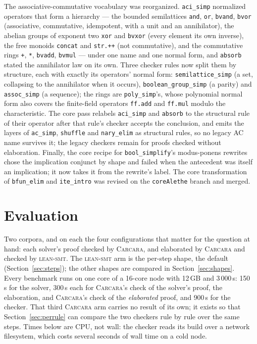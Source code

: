\documentclass[runningheads]{llncs}
\newcommand{\tactic}{\textsc{lean-smt}\xspace}
\newcommand{\carcara}{\textsc{Carcara}\xspace}
\newcommand{\rulename}[1]{\texttt{#1}}
\begin{document}
The associative-commutative vocabulary was reorganized. \rulename{aci\_simp}
normalized operators that form a hierarchy --- the bounded semilattices
\texttt{and}, \texttt{or}, \texttt{bvand}, \texttt{bvor} (associative,
commutative, idempotent, with a unit and an annihilator), the abelian groups
of exponent two \texttt{xor} and \texttt{bvxor} (every element its own
inverse), the free monoids \texttt{concat} and \texttt{str.++} (not
commutative), and the commutative rings \texttt{+}, \texttt{*},
\texttt{bvadd}, \texttt{bvmul} --- under one name and one normal form, and
\rulename{absorb} stated the annihilator law on its own. Three checker rules
now split them by structure, each with exactly its operators' normal form:
\rulename{semilattice\_simp} (a set, collapsing to the annihilator when it
occurs), \rulename{boolean\_group\_simp} (a parity) and \rulename{assoc\_simp}
(a sequence); the rings are \rulename{poly\_simp}'s, whose polynomial normal
form also covers the finite-field operators \texttt{ff.add} and
\texttt{ff.mul} modulo the characteristic. The core pass relabels
\rulename{aci\_simp} and \rulename{absorb} to the structural rule of their
operator after that rule's checker accepts the conclusion, and emits the
layers of \rulename{ac\_simp}, \rulename{shuffle} and \rulename{nary\_elim}
as structural rules, so no legacy AC name survives it; the legacy checkers
remain for proofs checked without elaboration. Finally, the core recipe for
\rulename{bool\_simplify}'s modus-ponens rewrites chose the implication
conjunct by shape and failed when the antecedent was itself an implication;
it now takes it from the rewrite's label. The core transformation of
\rulename{bfun\_elim} and \rulename{ite\_intro} was revised on the
\texttt{coreAlethe} branch and merged.

\section{Evaluation}
\label{sec:eval}

Two corpora, and on each the four configurations that matter for the
question at hand: each solver's proof checked by \carcara, and elaborated by
\carcara and checked by \tactic. The \tactic arm is the per-step shape, the
default (Section~\ref{sec:steps}); the other shapes are compared in
Section~\ref{sec:shapes}. Every benchmark runs on one core of a 16-core node
with 12\,GB and 3\,000\,s: 150\,s for the solver, 300\,s each for \carcara's
check of the solver's proof, the elaboration, and \carcara's check of the
\emph{elaborated} proof, and 900\,s for the checker. That third \carcara arm
carries no result of its own; it exists so that Section~\ref{sec:perrule} can
compare the two checkers rule by rule over the same steps. Times below are
CPU, not wall: the checker reads its build over a network filesystem, which
costs several seconds of wall time on a cold node.
\end{document}
